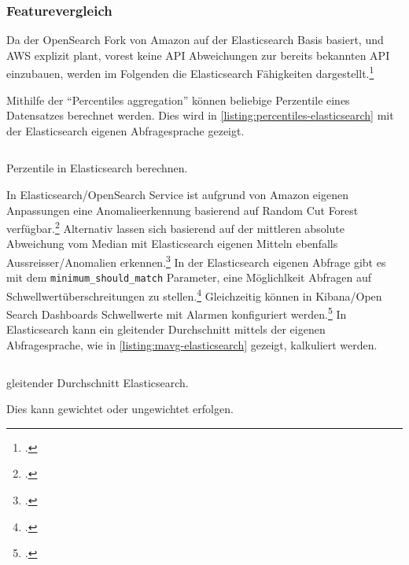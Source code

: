 \subsubsection{Featurevergleich}
Da der OpenSearch Fork von Amazon auf der Elasticsearch Basis basiert, und \ac{AWS} explizit plant, vorest keine \ac{API} Abweichungen zur bereits bekannten \ac{API} einzubauen, werden im Folgenden die Elasticsearch Fähigkeiten dargestellt.\footcite[Vgl.][]{Meadows.2021}

Mithilfe der \enquote{Percentiles aggregation} können beliebige Perzentile eines Datensatzes berechnet werden. Dies wird in \autoref{listing:percentiles-elasticsearch} mit der Elasticsearch eigenen Abfragesprache gezeigt. 
\begin{listing}[H]
\inputminted[frame=lines,breaklines=true]{json}{code/elasticsearch/percentiles.json}
\caption[Perzentile in Elasticsearch berechnen]{Perzentile in Elasticsearch berechnen.\footnotemark}
\label{listing:percentiles-elasticsearch}
\end{listing}
In Elasticsearch/OpenSearch Service ist aufgrund von Amazon eigenen Anpassungen eine Anomalieerkennung basierend auf Random Cut Forest verfügbar.\footcite[Vgl.][]{AmazonWebServicesInc..o.J.al}
Alternativ lassen sich basierend auf der mittleren absolute Abweichung vom Median mit Elasticsearch eigenen Mitteln ebenfalls Aussreisser/Anomalien erkennen.\footcite[Vgl.][]{ElasticsearchInc..o.J.c} 
In der Elasticsearch eigenen Abfrage gibt es mit dem \texttt{minimum_should_match} Parameter, eine Möglichlkeit Abfragen auf Schwellwertüberschreitungen zu stellen.\footcite[Vgl.][]{ElasticsearchInc..o.J.e}
Gleichzeitig können in Kibana/Open Search Dashboards Schwellwerte mit Alarmen konfiguriert werden.\footcite[Vgl.][]{Handler.2019}
In Elasticsearch kann ein gleitender Durchschnitt mittels der eigenen Abfragesprache, wie in \autoref{listing:mavg-elasticsearch} gezeigt, kalkuliert werden.

\begin{listing}[H]
\inputminted[frame=lines,breaklines=true]{json}{code/elasticsearch/mavg.json}
\caption[gleitender Durchschnitt Elasticsearch]{gleitender Durchschnitt Elasticsearch.\footnotemark}
\label{listing:mavg-elasticsearch}
\end{listing}

Dies kann gewichtet oder ungewichtet erfolgen.

